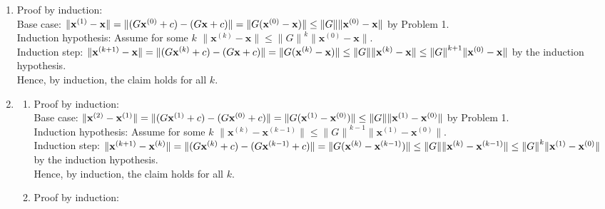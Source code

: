 \documentclass[10pt]{article}
\begin{document}
\begin{enumerate}[label=(\alph*)]
   \item Proof by induction:\\
   Base case: $\lVert \mathbf{x}^{(1)}-\mathbf{x}\rVert=\lVert(G\mathbf{x}^{(0)}+c)-(G\mathbf{x}+c)\rVert\\
   =\lVert G(\mathbf{x}^{(0)}-\mathbf{x})\rVert\le\lVert G\rVert\lVert \mathbf{x}^{(0)}-\mathbf{x}\rVert$ by Problem 1.\\
   Induction hypothesis: Assume for some $k$ $\lVert \mathbf{x}^{(k)}-\mathbf{x}\rVert\le {\lVert G\rVert}^k\lVert \mathbf{x}^{(0)}-\mathbf{x}\rVert$.\\
   Induction step: $\lVert \mathbf{x}^{(k+1)}-\mathbf{x}\rVert=\lVert(G\mathbf{x}^{(k)}+c)-(G\mathbf{x}+c)\rVert\\
   =\lVert G(\mathbf{x}^{(k)}-\mathbf{x})\rVert\le\lVert G\rVert\lVert \mathbf{x}^{(k)}-\mathbf{x}\rVert\\
   \le{\lVert G\rVert}^{k+1}\lVert \mathbf{x}^{(0)}-\mathbf{x}\rVert$ by the induction hypothesis.\\
   Hence, by induction, the claim holds for all $k$.
   \item \begin{enumerate}[label=(\roman*)]
      \item Proof by induction:\\
      Base case: $\lVert \mathbf{x}^{(2)}-\mathbf{x}^{(1)}\rVert=\lVert(G\mathbf{x}^{(1)}+c)-(G\mathbf{x}^{(0)}+c)\rVert\\
      =\lVert G(\mathbf{x}^{(1)}-\mathbf{x}^{(0)})\rVert\le\lVert G\rVert\lVert \mathbf{x}^{(1)}-\mathbf{x}^{(0)}\rVert$ by Problem 1.\\
      Induction hypothesis: Assume for some $k$ $\lVert \mathbf{x}^{(k)}-\mathbf{x}^{(k-1)}\rVert\le {\lVert G\rVert}^{k-1}\lVert \mathbf{x}^{(1)}-\mathbf{x}^{(0)}\rVert$.\\
      Induction step: $\lVert \mathbf{x}^{(k+1)}-\mathbf{x}^{(k)}\rVert=\lVert(G\mathbf{x}^{(k)}+c)-(G\mathbf{x}^{(k-1)}+c)\rVert\\
      =\lVert G(\mathbf{x}^{(k)}-\mathbf{x}^{(k-1)})\rVert\le\lVert G\rVert\lVert \mathbf{x}^{(k)}-\mathbf{x}^{(k-1)}\rVert\\
      \le{\lVert G\rVert}^{k}\lVert \mathbf{x}^{(1)}-\mathbf{x}^{(0)}\rVert$ by the induction hypothesis.\\
      Hence, by induction, the claim holds for all $k$.
      \item Proof by induction:\\

\end{enumerate}
\end{enumerate}
\end{document}
